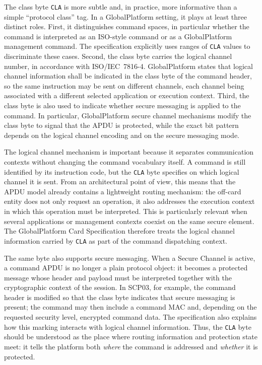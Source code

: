The class byte \texttt{CLA} is more subtle and, in practice, more informative
than a simple ``protocol class'' tag. In a GlobalPlatform setting, it plays at
least three distinct roles.  First, it distinguishes command spaces, in
particular whether the command is interpreted as an ISO-style command or as a
GlobalPlatform management command. The specification explicitly uses
ranges of \texttt{CLA} values to discriminate these cases. Second, the class
byte carries the logical channel number, in accordance with ISO/IEC~7816-4.
GlobalPlatform states that logical channel information shall be indicated in
the class byte of the command header, so the same instruction may be sent on
different channels, each channel being associated with a different selected
application or execution context. Third, the class byte is also used to
indicate whether secure messaging is applied to the command. In particular,
GlobalPlatform secure channel mechanisms modify the class byte to signal that
the APDU is protected, while the exact bit pattern depends on the logical
channel encoding and on the secure messaging mode.   

The logical channel mechanism is important because it separates communication
contexts without changing the command vocabulary itself. A command is still
identified by its instruction code, but the \texttt{CLA} byte specifies on
which logical channel it is sent. From an architectural point of view, this
means that the APDU model already contains a lightweight routing mechanism: the
off-card entity does not only request an operation, it also addresses the
execution context in which this operation must be interpreted. This is
particularly relevant when several applications or management contexts coexist
on the same secure element. The GlobalPlatform Card Specification therefore treats the
logical channel information carried by \texttt{CLA} as part of the command
dispatching context. 

The same byte also supports secure messaging. When a Secure Channel is active,
a command APDU is no longer a plain protocol object: it becomes a protected
message whose header and payload must be interpreted together with the
cryptographic context of the session. In SCP03, for example, the command header
is modified so that the class byte indicates that secure messaging is present;
the command may then include a command MAC and, depending on the requested
security level, encrypted command data. The specification also explains how
this marking interacts with logical channel information. Thus, the \texttt{CLA}
byte should be understood as the place where routing information and protection
state meet: it tells the platform both \emph{where} the command is addressed
and \emph{whether} it is protected.  


